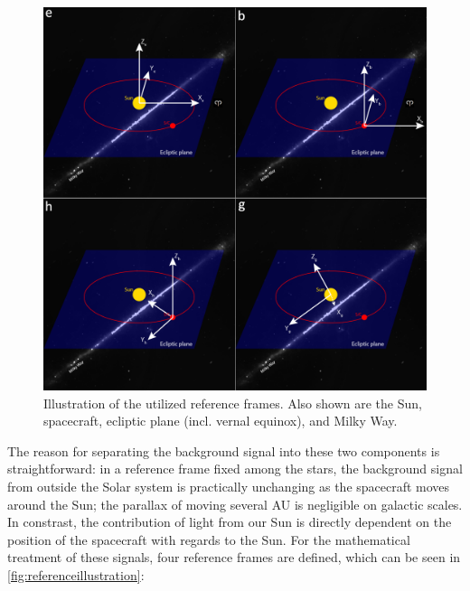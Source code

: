 \begin{figure}[htbp]
 \centering
 \includegraphics[width=1.0\textwidth]{img/referenceframes.png}
 \caption{Illustration of the utilized reference frames. Also shown are the Sun, spacecraft, ecliptic plane (incl. vernal equinox), and Milky Way.}
 \label{fig:referenceillustration}
\end{figure}


The reason for separating the background signal into these two components is straightforward: in a reference frame fixed among the stars, the background signal from outside the Solar system is practically unchanging as the spacecraft moves around the Sun; the parallax of moving several AU is negligible on galactic scales. In constrast, the contribution of light from our Sun is directly dependent on the position of the spacecraft with regards to the Sun. For the mathematical treatment of these signals, four reference frames are defined, which can be seen in \autoref{fig:referenceillustration}:

\newpage

